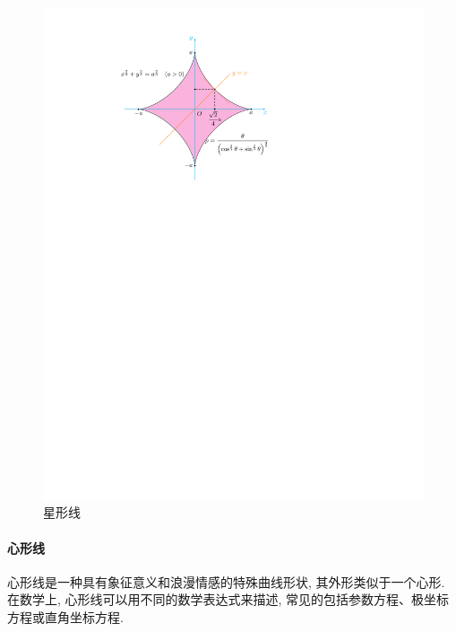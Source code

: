 \begin{figure}[H]
    \centering
    \includegraphics{figures/StarLine.pdf}
    \caption{星形线}
    \label{starLine}
\end{figure}

\paragraph{心形线}

心形线是一种具有象征意义和浪漫情感的特殊曲线形状, 其外形类似于一个心形. 在数学上, 心形线可以用不同的数学表达式来描述, 常见的包括参数方程、极坐标方程或直角坐标方程. 

